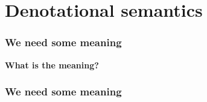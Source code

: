 \section{Denotational semantics}

\begin{frame}
    \frametitle{We need some meaning}

    \centering

    \huge
    \textbf{What is the meaning?}

\end{frame}

\begin{frame}
    \frametitle{We need some meaning}

    \centering


\end{frame}

